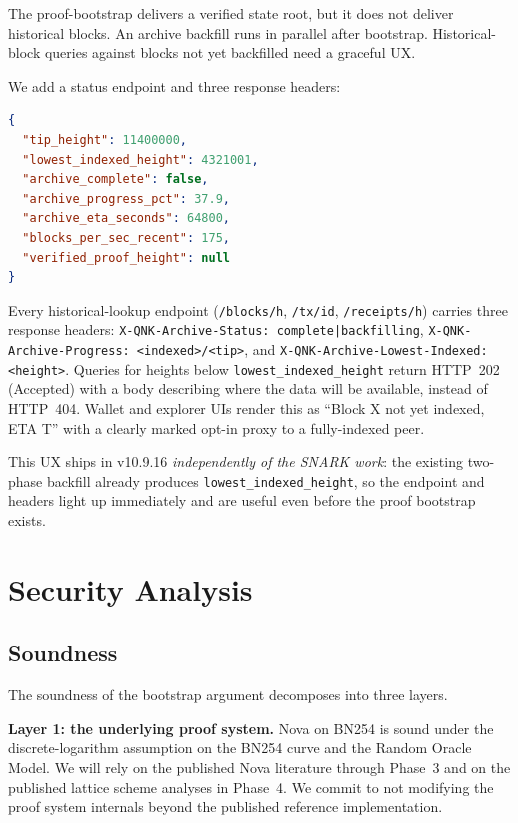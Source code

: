 \documentclass[11pt,a4paper]{article}
\begin{document}
The proof-bootstrap delivers a verified state root, but it does not
deliver historical blocks. An archive backfill runs in parallel after
bootstrap. Historical-block queries against blocks not yet
backfilled need a graceful UX.

We add a status endpoint and three response headers:

\begin{lstlisting}[language=json,caption={\texttt{GET /api/v1/status/archive} response body.},label={lst:status-archive}]
{
  "tip_height": 11400000,
  "lowest_indexed_height": 4321001,
  "archive_complete": false,
  "archive_progress_pct": 37.9,
  "archive_eta_seconds": 64800,
  "blocks_per_sec_recent": 175,
  "verified_proof_height": null
}
\end{lstlisting}

Every historical-lookup endpoint (\texttt{/blocks/{h}}, \texttt{/tx/{id}},
\texttt{/receipts/{h}}) carries three response headers:
\texttt{X-QNK-Archive-Status: complete|backfilling},
\texttt{X-QNK-Archive-Progress: <indexed>/<tip>}, and
\texttt{X-QNK-Archive-Lowest-Indexed: <height>}. Queries for heights
below \texttt{lowest\_indexed\_height} return HTTP~202 (Accepted) with
a body describing where the data will be available, instead of HTTP~404.
Wallet and explorer UIs render this as ``Block X not yet indexed,
ETA T'' with a clearly marked opt-in proxy to a fully-indexed peer.

This UX ships in v10.9.16 \emph{independently of the SNARK work}:
the existing two-phase backfill already produces
\texttt{lowest\_indexed\_height}, so the endpoint and headers light up
immediately and are useful even before the proof bootstrap exists.

\section{Security Analysis}
\label{sec:security}

\subsection{Soundness}

The soundness of the bootstrap argument decomposes into three layers.

\textbf{Layer 1: the underlying proof system.} Nova on BN254 is sound
under the discrete-logarithm assumption on the BN254 curve and the
Random Oracle Model. We will rely on the published Nova literature
through Phase~3 and on the published lattice scheme analyses in
Phase~4. We commit to not modifying the proof system internals beyond
the published reference implementation.
\end{document}
